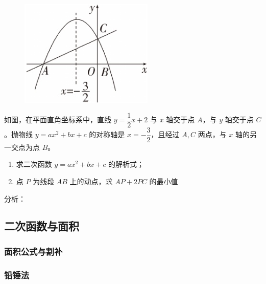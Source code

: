 \begin{figure}
    \includegraphics[width=1.2\linewidth]{figure/g4.png}
    \caption{}
    \label{fig:g4}
\end{figure}

\vspace{0.5cm}
\exas
{
如图，在平面直角坐标系中，直线 \( y = \dfrac{1}{2}x + 2 \) 与 \( x \) 轴交于点 \( A \)，与 \( y \) 轴交于点 \( C \)。抛物线 \( y = ax^2 + bx + c \) 的对称轴是 \( x = -\dfrac{3}{2} \)，且经过 \( A, C \) 两点，与 \( x \) 轴的另一交点为点 \( B \)。

\begin{enumerate}
    \item 求二次函数 \( y = ax^2 + bx + c \) 的解析式；
    \item 点 \( P \) 为线段 \( AB \) 上的动点，求 \( AP+2PC \) 的最小值
\end{enumerate}

}
{分析：
}




\subsection{二次函数与\textbf{面积}}

\subsubsection*{面积公式与割补}

\subsubsection*{铅锤法}

